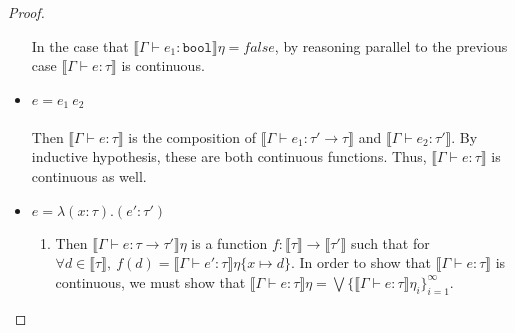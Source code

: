\documentclass{westhesis}
\theoremstyle{plain}
\theoremstyle{definition}
\begin{document}
\begin{proof}
\begin{itemize}
In the case that $\llbracket \Gamma \vdash e_1 : \texttt{bool} \rrbracket\eta = false$, by reasoning parallel to the previous 
case $\llbracket \Gamma \vdash e : \tau \rrbracket$ is continuous.
 \item $ e = e_1 \ e_2$ \\ \\
 Then $\llbracket \Gamma \vdash e : \tau \rrbracket$ is the composition of $\llbracket \Gamma \vdash e_1 : \tau' \rightarrow
 \tau \rrbracket$ and $\llbracket \Gamma \vdash e_2 : \tau' \rrbracket$. By inductive hypothesis, these are both continuous 
 functions. Thus, $\llbracket \Gamma \vdash e : \tau \rrbracket$ is continuous as well. 
 \item $e = \lambda (x : \tau) . (e' : \tau')$
 \begin{enumerate}
 \item Then $\llbracket \Gamma \vdash e : \tau \rightarrow \tau' \rrbracket\eta$ is a function $f: \llbracket \tau \rrbracket 
 \rightarrow 
 \llbracket \tau'  \rrbracket$ such that for $\forall d \in \llbracket \tau \rrbracket, \ f(d) = \llbracket \Gamma \vdash e' : \tau 
 \rrbracket\eta\{x \mapsto d\}$. In order to show that $\llbracket \Gamma \vdash e : \tau \rrbracket$ is continuous, we 
 must show that $\llbracket \Gamma \vdash e : \tau \rrbracket\eta = \bigvee \{ \llbracket \Gamma \vdash e : \tau \rrbracket
  \eta_i \}^{\infty}_{i=1}$. 
 

\end{enumerate}
\end{itemize}
\end{proof}
\end{document}
